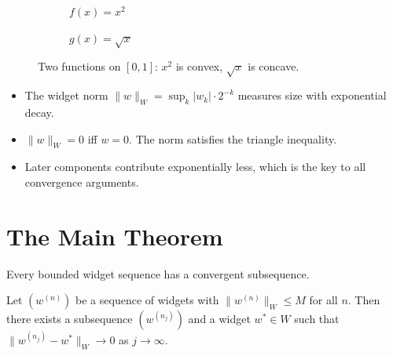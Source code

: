 \documentclass[10pt, a4paper]{article}
\theoremstyle{definition}
\theoremstyle{remark}
\begin{document}
\begin{figure}[H]
  \centering
  \begin{subfigure}[t]{0.48\textwidth}
    \centering
    \caption{$f(x) = x^2$}
  \end{subfigure}\hfill
  \begin{subfigure}[t]{0.48\textwidth}
    \centering
    \caption{$g(x) = \sqrt{x}$}
  \end{subfigure}
  \caption{Two functions on $[0,1]$: $x^2$ is convex, $\sqrt{x}$ is concave.}
  \label{fig:two-functions}
\end{figure}


\begin{sumbox}
\begin{itemize}
  \item The widget norm $\|w\|_W = \sup_k |w_k| \cdot 2^{-k}$ measures size with exponential decay.
  \item $\|w\|_W = 0$ iff $w = 0$. The norm satisfies the triangle inequality.
  \item Later components contribute exponentially less, which is the key to all convergence arguments.
\end{itemize}
\end{sumbox}


\section{The Main Theorem}

Every bounded widget sequence has a convergent subsequence.

\begin{thmbox}
Let $(w^{(n)})$ be a sequence of widgets with $\|w^{(n)}\|_W \le M$ for
all $n$. Then there exists a subsequence $(w^{(n_j)})$ and a widget
$w^* \in W$ such that
$\|w^{(n_j)} - w^*\|_W \to 0$ as $j \to \infty$.
\end{thmbox}
\end{document}
